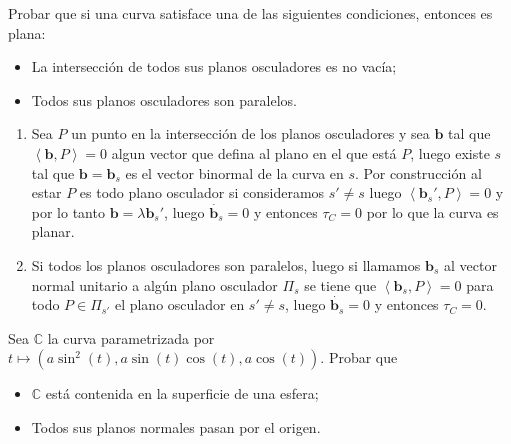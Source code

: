 \documentclass[11pt]{article}
\newcommand{\C}{\mathbb{C}}
\newcommand\ip[1]{\left\langle#1\right\rangle}
\newcommand\bb{\mathbf{b}}                      %
\newenvironment{proof}[1][Demostraci\'on]{\begin{trivlist}
		\item[\hskip \labelsep {\bfseries #1}]}{\end{trivlist}}
\newcommand{\qed}{\nobreak \ifvmode \relax \else
	\ifdim\lastskip<1.5em \hskip-\lastskip
	\hskip1.5em plus0em minus0.5em \fi \nobreak
	\vrule height0.75em width0.5em depth0.25em\fi}
\begin{document}
\begin{enumerate}
\begin{proof}
\begin{enumerate}
			
		\end{enumerate}
		
	\end{proof}
	
	\item Probar que si una curva satisface una de las siguientes condiciones, entonces es
	plana:
	\begin{itemize}
		\item La intersecci\'on de todos sus planos osculadores es no vac\'ia;
		\item Todos sus planos osculadores son paralelos.
	\end{itemize}
	
	\label{Ejercicio 3}
	
	\begin{proof}
		
		\begin{enumerate}
			
			\item Sea $P$ un punto en la intersecci\'on de los planos osculadores y sea $\bb$ tal que $\ip{\bb , P} = 0$ algun vector que defina al plano en el que est\'a $P$, luego existe $s$ tal que $\bb = \bb_s$ es el vector binormal de la curva en $s$. Por construcci\'on al estar $P$ es todo plano osculador si consideramos $s' \neq s$ luego $\ip {\bb_s' ,P } = 0$ y por lo tanto $\bb = \lambda \bb_s'$, luego $\dot{\bb_s} = 0$ y entonces $\tau_C = 0$ por lo que la curva es planar.
			
			\item Si todos los planos osculadores son paralelos, luego si llamamos $\bb_s$ al vector normal unitario a alg\'un plano osculador $\Pi_s$ se tiene que $\ip{ \bb_s , P} = 0$ para todo $P \in \Pi_{s'}$ el plano osculador en $s' \neq s$, luego $\dot{\bb_s} = 0$ y entonces $\tau_C = 0$. \qed
			
			
		\end{enumerate}
		
	\end{proof}
	
	\item Sea $\C$ la curva parametrizada por $t \mapsto (a \sin^2(t), a \sin(t) \cos(t), a
	\cos(t))$. Probar que 
	\begin{itemize}
		\item $\C$ est\'a contenida en la superficie de una esfera;
		\item Todos sus planos normales pasan por el origen.
	\end{itemize}
	

\end{enumerate}
\end{document}
